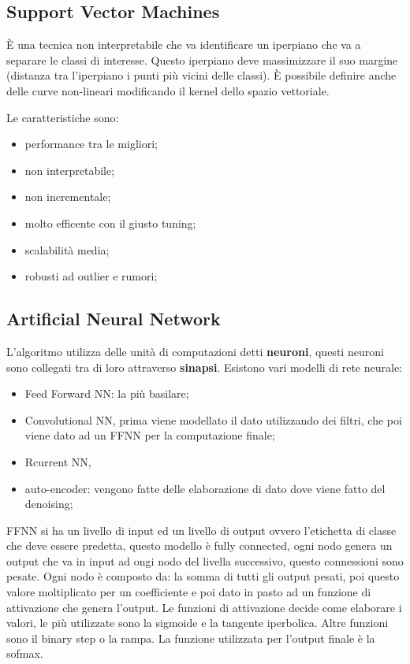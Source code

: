 \documentclass[12pt]{article}
\begin{document}
\subsection{Support Vector Machines}
\`E una tecnica non interpretabile che va identificare un iperpiano che va a separare le classi di interesse. Questo iperpiano deve massimizzare il suo margine (distanza tra l'iperpiano i punti pi\`u vicini delle classi). \`E possibile definire anche delle curve non-lineari modificando il kernel dello spazio vettoriale.

Le caratteristiche sono:
\begin{itemize}
    \item performance tra le migliori;
    \item non interpretabile;
    \item non incrementale;
    \item molto efficente con il giusto tuning;
    \item scalabilit\`a media;
    \item robusti ad outlier e rumori;
\end{itemize}


\subsection{Artificial Neural Network}
L'algoritmo utilizza delle unit\`a di computazioni detti \textbf{neuroni}, questi neuroni sono collegati tra di loro attraverso \textbf{sinapsi}. Esistono vari modelli di rete neurale:
\begin{itemize}
    \item Feed Forward NN: la pi\`u basilare;
    \item Convolutional NN, prima viene modellato il dato utilizzando dei filtri, che poi viene dato ad un FFNN per la computazione finale;
    \item Rcurrent NN, 
    \item auto-encoder: vengono fatte delle elaborazione di dato dove viene fatto del denoising;
\end{itemize}

FFNN si ha un livello di input ed un livello di output ovvero l'etichetta di classe che deve essere predetta, questo modello \`e fully connected, ogni nodo genera un output che va in input ad ongi nodo del livella successivo, questo connessioni sono pesate. Ogni nodo \`e composto da: la somma di tutti gli output pesati, poi questo valore moltiplicato per un coefficiente e poi dato in pasto ad un funzione di attivazione che genera l'output. Le funzioni di attivazione decide come elaborare i valori, le pi\`u utilizzate sono la sigmoide e la tangente iperbolica. Altre funzioni sono il binary step o la rampa. La funzione utilizzata per l'output finale \`e la sofmax. 
\end{document}
